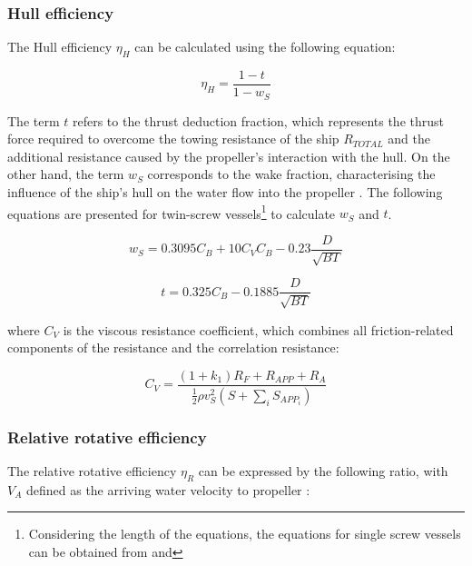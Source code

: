 \subsubsection*{Hull efficiency}

The Hull efficiency $\eta_H$ can be calculated using the following equation:

\begin{equation}
    \label{eqn:hull_eff}
    \eta_H = \frac{1 - t}{1 - w_S}
\end{equation}

The term $t$ refers to the thrust deduction fraction, which represents the thrust force required to overcome the towing resistance of the ship $R_{TOTAL}$ and the additional resistance caused by the propeller's interaction with the hull. On the other hand, the term $w_S$ corresponds to the wake fraction, characterising the influence of the ship's hull on the water flow into the propeller . The following equations are presented for twin-screw vessels\footnote{Considering the length of the equations, the equations for single screw vessels can be obtained from  and } to calculate $w_S$ and $t$.

\begin{equation}
    \label{eqn:wake_ws}
    w_S = 0.3095 C_B + 10 C_V C_B -0.23 \frac{D}{\sqrt{BT}}
\end{equation}

\begin{equation}
    \label{eqn:thrust_t}
    t = 0.325 C_B - 0.1885 \frac{D}{\sqrt{BT}}
\end{equation}

where $C_V$ is the viscous resistance coefficient, which combines all friction-related components of the resistance and the correlation resistance:

\begin{equation}
    \label{eqn:C_V}
    C_V = \frac{(1+k_1)R_F+R_{APP}+R_A}{\frac{1}{2}\rho v_S^2 (S+\sum_i S_{APP_i})}
\end{equation}

\subsubsection*{Relative rotative efficiency}

The relative rotative efficiency $\eta_R$ can be expressed by the following ratio, with $V_A$ defined as the arriving water velocity to propeller :

